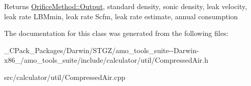 \begin{DoxyReturn}{Returns}
\hyperlink{struct_orifice_method_1_1_output}{Orifice\+Method\+::\+Output}, standard density, sonic density, leak velocity, leak rate L\+B\+Mmin, leak rate Scfm, leak rate estimate, annual consumption 
\end{DoxyReturn}


The documentation for this class was generated from the following files\+:\begin{DoxyCompactItemize}
\item 
\+\_\+\+C\+Pack\+\_\+\+Packages/\+Darwin/\+S\+T\+G\+Z/amo\+\_\+tools\+\_\+suite-\/-\/\+Darwin-\/x86\+\_/amo\+\_\+tools\+\_\+suite/include/calculator/util/Compressed\+Air.\+h\item 
src/calculator/util/Compressed\+Air.\+cpp\end{DoxyCompactItemize}
